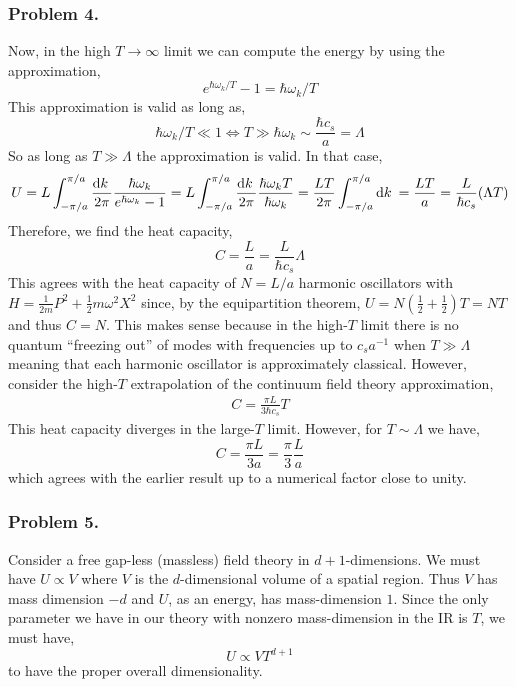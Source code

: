 \documentclass[12pt]{article}
\begin{document}
\subsubsection{Problem 4.}

Now, in the high $T \to \infty$ limit we can compute the energy by using the approximation,
\[ e^{\hbar \omega_k / T} - 1 = \hbar \omega_k / T \]
This approximation is valid as long as,
\[ \hbar \omega_k / T \ll 1 \iff T \gg \hbar \omega_k \sim \frac{\hbar c_s}{a} = \Lambda \] 
So as long as $T \gg \Lambda$ the approximation is valid.
In that case,
\[ U = L \int_{- \pi/a}^{\pi / a} \frac{\mathrm{d}k \:}{2 \pi} \frac{\hbar \omega_k}{e^{\hbar \omega_k} - 1} = L \int_{- \pi / a}^{\pi / a} \frac{\mathrm{d}k \:}{2 \pi} \frac{\hbar \omega_k T}{\hbar \omega_k} = \frac{L T}{2 \pi} \int_{-\pi / a}^{\pi / a} \mathrm{d}k \: = \frac{L T}{a} = \frac{L}{\hbar c_s} (\Lambda T) \] 
Therefore, we find the heat capacity,
\[ C = \frac{L}{a} = \frac{L}{\hbar c_s} \Lambda \]
This agrees with the heat capacity of $N = L/a$ harmonic oscillators with $H = \tfrac{1}{2m} P^2 + \tfrac{1}{2} m \omega^2 X^2$ since, by the equipartition theorem, $U = N \left( \tfrac{1}{2} + \tfrac{1}{2} \right) T = NT$ and thus $C = N$. This makes sense because in the high-$T$ limit there is no quantum ``freezing out'' of modes with frequencies up to $c_s a^{-1}$  when $T \gg \Lambda$ meaning that each harmonic oscillator is approximately classical.
However, consider the high-$T$ extrapolation of the continuum field theory approximation,
\begin{align*}
C = \frac{\pi L}{3 \hbar c_s} T 
\end{align*}  
This heat capacity diverges in the large-$T$ limit. However, for $T \sim \Lambda$ we have,
\[ C = \frac{\pi L}{3 a} = \frac{\pi}{3} \frac{L}{a} \]
which agrees with the earlier result up to a numerical factor close to unity. 


\subsubsection{Problem 5.}

Consider a free gap-less (massless) field theory in $d + 1$-dimensions. We must have $U \propto V$ where $V$ is the $d$-dimensional volume of a spatial region. Thus $V$ has mass dimension $-d$ and $U$, as an energy, has mass-dimension $1$. Since the only parameter we have in our theory with nonzero mass-dimension in the IR is $T$, we must have,
\[ U \propto V T^{d + 1} \]
to have the proper overall dimensionality. 
\end{document}
